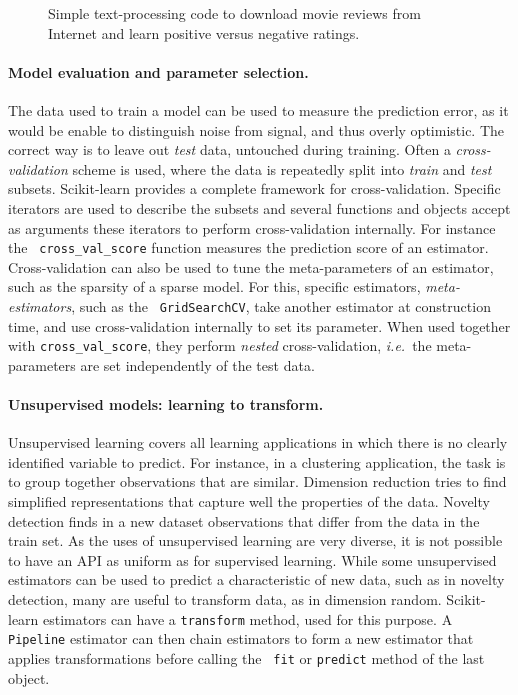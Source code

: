 \documentclass[a4paper]{article}
\begin{document}
\begin{figure}[b]

\caption{Simple text-processing code to download movie reviews from
Internet and learn positive versus negative ratings.\label{fig:code}}
\end{figure}


\paragraph{Model evaluation and parameter selection.}
%
The data used to train a model can be used to measure the prediction
error, as it would be enable to distinguish noise from signal, and thus
overly optimistic. The correct way is to leave out \emph{test} data,
untouched during training. Often a \emph{cross-validation} scheme is
used, where the data is repeatedly split into \emph{train} and
\emph{test} subsets. Scikit-learn provides a complete framework for
cross-validation. Specific iterators are used to describe the subsets and
several functions and objects accept as arguments these iterators to
perform cross-validation internally. For instance the {\tt
cross\_val\_score} function measures the prediction score of an
estimator. Cross-validation can also be used to tune the meta-parameters
of an estimator, such as the sparsity of a sparse model. For this,
specific estimators, \emph{meta-estimators}, such as the {\tt
GridSearchCV}, take another estimator at construction time, and use
cross-validation internally to set its parameter. When used together with
{\tt cross\_val\_score}, they perform \emph{nested} cross-validation,
\emph{i.e.}~the meta-parameters are set independently of the test data.

\paragraph{Unsupervised models: learning to transform.}
%
Unsupervised learning covers all learning applications in which there is
no clearly identified variable to predict. For instance, in a clustering
application, the task is to group together observations that are similar.
Dimension reduction tries to find simplified representations that capture
well the properties of the data. Novelty detection finds in a new dataset
observations that differ from the data in the train set. As the uses of
unsupervised learning are very diverse, it is not possible to have an API
as uniform as for supervised learning. While some unsupervised
estimators can be used to predict a characteristic of new data, such as
in novelty detection, many are useful to transform data, as in dimension
random. Scikit-learn estimators can have a {\tt transform} method, used
for this purpose. A {\tt Pipeline} estimator can then chain estimators to
form a new estimator that applies transformations before calling the {\tt
fit} or {\tt predict} method of the last object.
\end{document}
